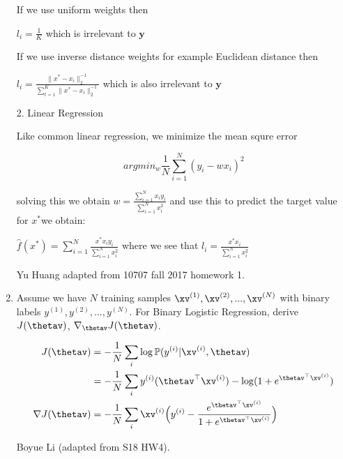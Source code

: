 \begin{enumerate}
\begin{soln}
    If we use uniform weights then
    
    $l_{i}=\frac{1}{K}$ which is irrelevant to $\mathbf{y}$
    
    If we use inverse distance weights for example Euclidean distance then
    
    $l_{i}=\frac{\lVert x^{*}-x_{i}\lVert_{2}^{-1}}{\sum_{t=1}^{K}\lVert x^{*}-x_{i}\lVert_{2}^{-1}}$ which is also irrelevant to $\mathbf{y}$
    
    2. Linear Regression
    
    Like common linear regression, we minimize the mean squre error
    
    $$argmin_{w}\frac{1}{N}\sum_{i=1}^{N}(y_{i}-wx_{i})^{2}$$
    
    solving this we obtain $w=\frac{\sum_{i=1}^{N}x_{i}y_{i}}{\sum_{i=1}^{N}x_{i}^{2}}$ and use this to predict the target value for $x^{*}$we obtain:
    
    $\hat{f}(x^{*})=\sum_{i=1}^{N}\frac{x^{*}x_{i}y_{i}}{\sum_{i=1}^{N}x_{i}^{2}}$ where we see that $l_{i}=\frac{x^{*}x_{i}}{\sum_{i=1}^{N}x_{i}^{2}} $
    \end{soln}
    
    \begin{qauthor}
    Yu Huang adapted from 10707 fall 2017 homework 1.
    \end{qauthor}
    
    
    \item Assume we have $N$ training samples $\xv^{(1)}, \xv^{(2)},..., \xv^{(N)} $ with binary labels $y^{(1)}, y^{(2)},..., y^{(N)}$.
    For Binary Logistic Regression, derive $J(\thetav)$, $\nabla_{\thetav} J(\thetav)$.
    
    \begin{soln}
        \begin{align*}
        J(\thetav) 
        &= - \frac{1}{N} \sum_i \log \mathbb P (y^{(i)} \vert \xv^{(i)}, \thetav) \\
        &= - \frac{1}{N} \sum_i y^{(i)} (\thetav^\top \xv^{(i)}) - \log ( 1 + e^{\thetav^\top \xv^{(i)}}) \\
        \nabla J(\thetav)
        &= -\frac{1}{N} \sum_i \xv^{(i)} \Big( y^{(i)} - \frac{e^{\thetav^\top \xv^{(i)}}}{1 + e^{\thetav^\top \xv^{(i)}}} \Big)
        \end{align*}
    \end{soln}
    
    \begin{qauthor}
    Boyue Li (adapted from S18 HW4).
    \end{qauthor}
    

\end{enumerate}
